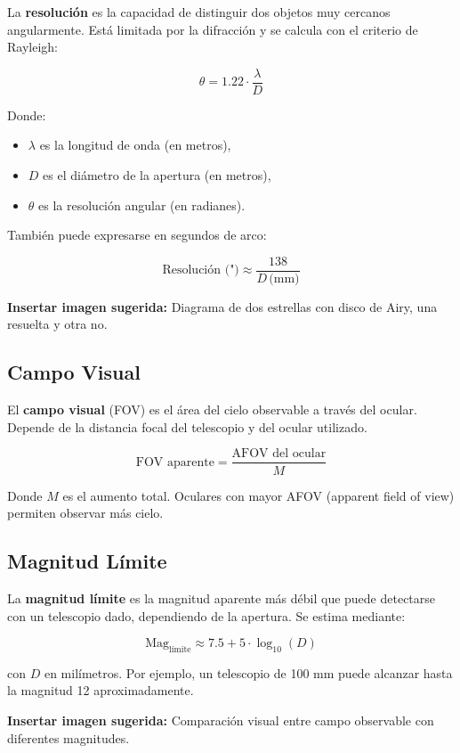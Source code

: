 La \textbf{resolución} es la capacidad de distinguir dos objetos muy cercanos angularmente. Está limitada por la difracción y se calcula con el criterio de Rayleigh:

\[
\theta = 1.22 \cdot \frac{\lambda}{D}
\]

Donde:
\begin{itemize}
	\item $\lambda$ es la longitud de onda (en metros),
	\item $D$ es el diámetro de la apertura (en metros),
	\item $\theta$ es la resolución angular (en radianes).
\end{itemize}

También puede expresarse en segundos de arco:

\[
\text{Resolución (")} \approx \frac{138}{D\,\text{(mm)}}
\]

\vspace{0.3cm}
\textbf{Insertar imagen sugerida:} Diagrama de dos estrellas con disco de Airy, una resuelta y otra no.

\subsection{Campo Visual}

El \textbf{campo visual} (FOV) es el área del cielo observable a través del ocular. Depende de la distancia focal del telescopio y del ocular utilizado.

\[
\text{FOV aparente} = \frac{\text{AFOV del ocular}}{M}
\]

Donde $M$ es el aumento total. Oculares con mayor AFOV (apparent field of view) permiten observar más cielo.

\subsection{Magnitud Límite}

La \textbf{magnitud límite} es la magnitud aparente más débil que puede detectarse con un telescopio dado, dependiendo de la apertura. Se estima mediante:

\[
\text{Mag}_{\text{límite}} \approx 7.5 + 5 \cdot \log_{10}(D)
\]

con $D$ en milímetros. Por ejemplo, un telescopio de 100 mm puede alcanzar hasta la magnitud 12 aproximadamente.

\vspace{0.3cm}
\textbf{Insertar imagen sugerida:} Comparación visual entre campo observable con diferentes magnitudes.

